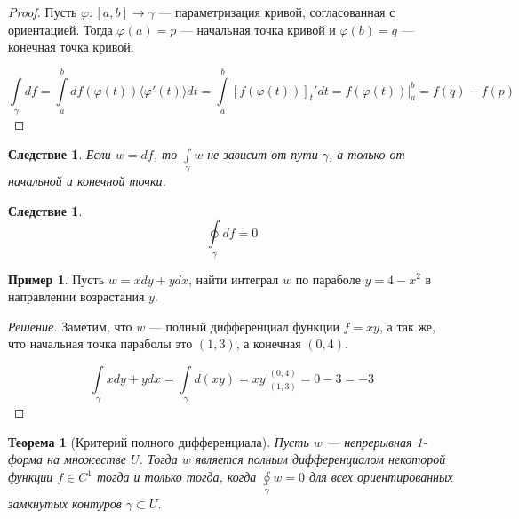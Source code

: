 \documentclass[a5paper]{article}
\newcounter{through}
\theoremstyle{plain}
\newtheorem{theorem}[through]{Теорема}
\newtheorem{corollary}[through]{Следствие}
\theoremstyle{definition}
\newtheorem{example}[through]{Пример}
\numberwithin{through}{section}
\numberwithin{equation}{section}
\begin{document}
\begin{proof}
	Пусть $\varphi : [a, b] \to \gamma$ --- параметризация кривой, согласованная с ориентацией. Тогда $\varphi(a) = p$ --- начальная точка кривой и $\varphi(b) = q$ --- конечная точка кривой.
	
	\begin{equation*}
		\int\limits_{\gamma} df = \int\limits_{a}^{b} df(\varphi(t)) \langle \varphi'(t) \rangle dt = \int\limits_{a}^{b} [f(\varphi(t))]_t'dt = f(\varphi(t)) \bigg|_{a}^{b}=f(q) - f(p)
	\end{equation*}
\end{proof}

\begin{corollary}
	Если $w=df$, то $\int\limits_{\gamma} w$ не зависит от пути $\gamma$, а только от начальной и конечной точки.
\end{corollary}

\begin{corollary} \label{ClosedLoopInt}
	\begin{equation*}
		\oint\limits_{\gamma} df = 0
	\end{equation*}
\end{corollary}

\begin{example}
	Пусть $w = xdy + ydx$, найти интеграл $w$ по параболе $y = 4 - x^2$ в направлении возрастания $y$. 
\end{example}

\begin{proof}[Решение]
	Заметим, что $w$ --- полный дифференциал функции $f=xy$, а так же, что начальная точка параболы это $(1, 3)$, а конечная $(0, 4)$.
	
	\begin{equation*}
		\int\limits_{\gamma} xdy + ydx = \int\limits_{\gamma} d(xy) = xy \bigg|_{(1, 3)}^{(0, 4)} = 0 - 3 = -3
	\end{equation*}
\end{proof}

\begin{theorem}[Критерий полного дифференциала]
	Пусть $w$ --- непрерывная 1-форма на множестве $U$. Тогда $w$ является полным дифференциалом некоторой функции $f \in C^1$ тогда и только тогда, когда $\oint\limits_{\gamma} w = 0$ для всех ориентированных замкнутых контуров $\gamma \subset U$.
\end{theorem}
\end{document}
